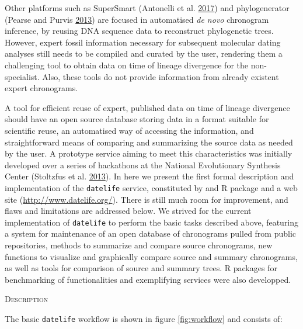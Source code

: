 \documentclass[]{article}
\begin{document}
Other platforms such as SuperSmart (Antonelli et al. \protect\hyperlink{ref-antonelli2017supersmart}{2017}) and phylogenerator (Pearse and Purvis \protect\hyperlink{ref-pearse2013phylogenerator}{2013}) are focused in automatised \emph{de novo} chronogram inference, by reusing DNA sequence data to reconstruct phylogenetic trees. However, expert fossil information necessary for subsequent molecular dating analyses still needs to be compiled and curated by the user, rendering them a challenging tool to obtain data on time of lineage divergence for the non-specialist. Also, these tools do not provide information from already existent expert chronograms.

A tool for efficient reuse of expert, published data on time of lineage divergence should have an open source database storing data in a format suitable for scientific reuse, an automatised way of accessing the information, and straightforward means of comparing and summarizing the source data as needed by the user.
A prototype service aiming to meet this characteristics was initially developed over a series of hackathons at the National Evolutionary Synthesis Center (Stoltzfus et al. \protect\hyperlink{ref-Stoltzfus2013}{2013}).
In here we present the first formal description and implementation of the \texttt{datelife} service, constituted by and R package and a web site (\url{http://www.datelife.org/}). There is still much room for improvement, and flaws and limitations are addressed below. We strived for the current implementation of \texttt{datelife} to perform the basic tasks described above, featuring a system for maintenance of an open database of chronograms pulled from public repositories, methods to summarize and compare source chronograms, new functions to visualize and graphically compare source and summary chronograms, as well as tools for comparison of source and summary trees. R packages for benchmarking of functionalities and exemplifying services were also developped.

\begin{center}
\textsc{Description}
\end{center}

The basic \texttt{datelife} workflow is shown in figure \ref{fig:workflow} and consists of:
\end{document}
